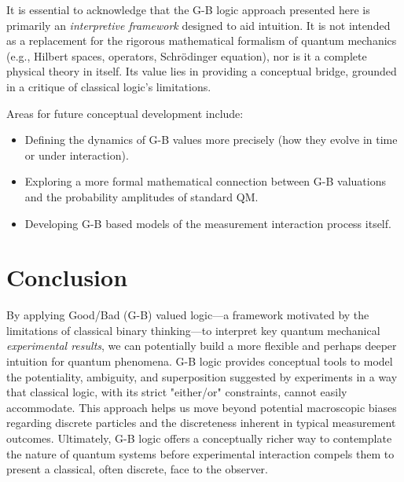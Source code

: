 \documentclass{article}
\begin{document}
It is essential to acknowledge that the G-B logic approach presented here is primarily an \textit{interpretive framework} designed to aid intuition. It is not intended as a replacement for the rigorous mathematical formalism of quantum mechanics (e.g., Hilbert spaces, operators, Schrödinger equation), nor is it a complete physical theory in itself. Its value lies in providing a conceptual bridge, grounded in a critique of classical logic's limitations.

Areas for future conceptual development include:
\begin{itemize}
    \item Defining the dynamics of G-B values more precisely (how they evolve in time or under interaction).
    \item Exploring a more formal mathematical connection between G-B valuations and the probability amplitudes of standard QM.
    \item Developing G-B based models of the measurement interaction process itself.
\end{itemize}

\section{Conclusion}

By applying Good/Bad (G-B) valued logic---a framework motivated by the limitations of classical binary thinking---to interpret key quantum mechanical \textit{experimental results}, we can potentially build a more flexible and perhaps deeper intuition for quantum phenomena. G-B logic provides conceptual tools to model the potentiality, ambiguity, and superposition suggested by experiments in a way that classical logic, with its strict "either/or" constraints, cannot easily accommodate. This approach helps us move beyond potential macroscopic biases regarding discrete particles and the discreteness inherent in typical measurement outcomes. Ultimately, G-B logic offers a conceptually richer way to contemplate the nature of quantum systems before experimental interaction compels them to present a classical, often discrete, face to the observer.
\end{document}
